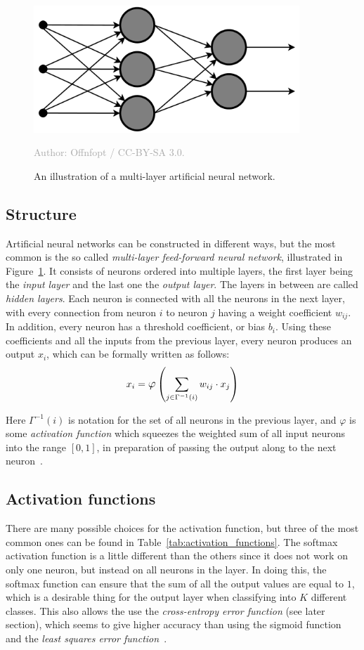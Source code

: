 \documentclass{kththesis}
\newcommand{\source}[1]{\vspace{-5mm}\caption*{\textcolor{darkgray}{Author: {#1}}\vspace{-7mm}} }
\begin{document}
\begin{figure}
  \begin{center}
    \includegraphics[width=100mm]{img/neural_network.png}
    \caption{An illustration of a multi-layer artificial neural network. }
    \source{Offnfopt / CC-BY-SA 3.0.}
    \label{fig:mlf}
  \end{center}
\end{figure}

\subsection{Structure}
Artificial neural networks can be constructed in different ways, but the most common is the so called \textit{multi-layer feed-forward neural network}, illustrated in Figure~\ref{fig:mlf}. It consists of neurons ordered into multiple layers, the first layer being the \textit{input layer} and the last one the \textit{output layer}. The layers in between are called \textit{hidden layers}. Each neuron is connected with all the neurons in the next layer, with every connection from neuron $i$ to neuron $j$ having a weight coefficient $w_{ij}$. In addition, every neuron has a threshold coefficient, or bias $b_i$. Using these coefficients and all the inputs from the previous layer, every neuron produces an output $x_i$, which can be formally written as follows:
\[x_i = \mathlarger{\varphi}\left(\sum_{j \in \Gamma^{-1}(i)}{w_{ij} \cdot x_j}\right)\]

Here $\Gamma^{-1}(i)$ is notation for the set of all neurons in the previous layer, and $\varphi$ is some \textit{activation function} which squeezes the weighted sum of all input neurons into the range $[0, 1]$, in preparation of passing the output along to the next neuron~\cite{mlfIntro}.

\subsection{Activation functions}
There are many possible choices for the activation function, but three of the most common ones can be found in Table~\ref{tab:activation_functions}. The softmax activation function is a little different than the others since it does not work on only one neuron, but instead on all neurons in the layer. In doing this, the softmax function can ensure that the sum of all the output values are equal to $1$, which is a desirable thing for the output layer when classifying into $K$ different classes. This also allows the use the \textit{cross-entropy error function} (see later section), which seems to give higher accuracy than using the sigmoid function and the \textit{least squares error function}~\cite{dunne1997pairing}.
\end{document}

